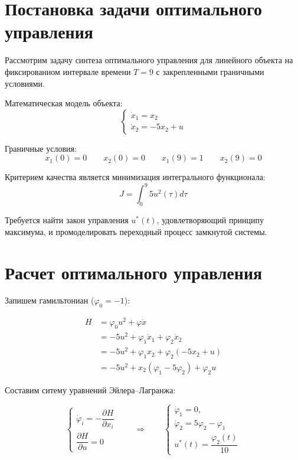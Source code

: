 \documentclass[a4paper,12pt]{article}
\begin{document}
	\newpage
	\tableofcontents
	
	\newpage 

\section{Постановка задачи оптимального управления}

Рассмотрим задачу синтеза оптимального управления для линейного объекта на фиксированном интервале времени $T=9$ с закрепленными граничными условиями.

Математическая модель объекта:
\begin{equation}
	\begin{cases}
		\dot{x}_1 = x_2 \\
		\dot{x}_2 = -5x_2 + u
	\end{cases}
\end{equation}

Граничные условия:
\begin{equation}
	x_1(0) = 0 \qquad x_2(0) = 0 \qquad x_1(9) = 1 \qquad x_2(9) = 0
\end{equation}

Критерием качества является минимизация интегрального функционала:
\begin{equation}
	J = \int_{0}^{9} 5u^2(\tau) d\tau
\end{equation}

Требуется найти закон управления $u^*(t)$, удовлетворяющий принципу максимума, и промоделировать переходный процесс замкнутой системы.

\newpage
\section{Расчет оптимального управления}

Запишем гамильтониан ($\varphi_0 = -1$):

\[
\begin{aligned}
	H &= \varphi_0 u^2 + \varphi \dot x \\
	&= -5u^2 + \varphi_1 \dot x_1 + \varphi_2 \dot x_2 \\
	&= -5u^2 + \varphi_1 x_2 + \varphi_2 (-5 x_2 + u) \\
	&= -5 u^2 + x_2 (\varphi_1 - 5 \varphi_2) + \varphi_2 u
\end{aligned}
\]


Составим ситему уравнений Эйлера--Лагранжа:

\[
\begin{cases}
	\dot \varphi_i = - \dfrac{\partial H}{\partial x_i} \\[8pt]
	\dfrac{\partial H}{\partial u} = 0
\end{cases} \qquad \Longrightarrow \qquad 
\begin{cases}
    \dot{\varphi}_1 = 0,\\[6pt]
\dot{\varphi}_2 = 5\varphi_2 - \varphi_1 \\[6pt]
u^*(t) = \dfrac{\varphi_2(t)}{10}
\end{cases}
\]
\end{document}
